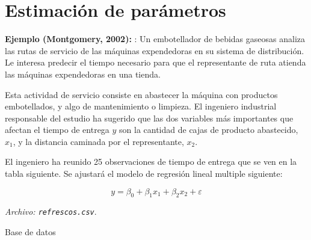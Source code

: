 \documentclass[
]{book}
\begin{document}
\section{Estimación de parámetros}\label{estimaciuxf3n-de-paruxe1metros}

\textbf{Ejemplo (Montgomery, 2002):} : Un embotellador de bebidas gaseosas analiza las rutas de servicio de las máquinas expendedoras en su sistema de distribución. Le interesa predecir el tiempo necesario para que el representante de ruta atienda las máquinas expendedoras en una tienda.

Esta actividad de servicio consiste en abastecer la máquina con productos embotellados, y algo de mantenimiento o limpieza. El ingeniero industrial responsable del estudio ha sugerido que las dos variables más importantes que afectan el tiempo de entrega \(y\) son la cantidad de cajas de producto abastecido, \(x_1\), y la distancia caminada por el representante, \(x_2\).

El ingeniero ha reunido 25 observaciones de tiempo de entrega que se ven en la tabla siguiente. Se ajustará el modelo de regresión lineal multiple siguiente:

\[
y = \beta_0 + \beta_1 x_1 + \beta_2 x_2 +  \varepsilon
\]

\emph{Archivo: \texttt{refrescos.csv}}.

Base de datos
\end{document}
